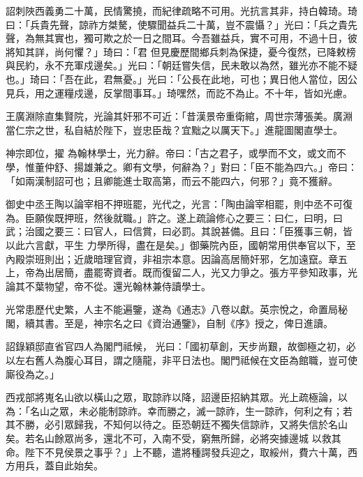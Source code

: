 \begin{pinyinscope}
 詔刺陜西義勇二十萬，民情驚撓，而紀律疏略不可用。光抗言其非，持白韓琦。琦曰：「兵貴先聲，諒祚方桀驁，使驟聞益兵二十萬，豈不震懾？」光曰：「兵之貴先聲，為無其實也，獨可欺之於一日之間耳。今吾雖益兵，實不可用，不過十日，彼將知其詳，尚何懼？」琦曰：「君
 但見慶歷間鄉兵刺為保捷，憂今復然，已降敕榜與民約，永不充軍戍邊矣。」光曰：「朝廷嘗失信，民未敢以為然，雖光亦不能不疑也。」琦曰：「吾在此，君無憂。」光曰：「公長在此地，可也；異日他人當位，因公見兵，用之運糧戍邊，反掌間事耳。」琦嘿然，而訖不為止。不十年，皆如光慮。



 王廣淵除直集賢院，光論其奸邪不可近：「昔漢景帝重衛綰，周世宗薄張美。廣淵當仁宗之世，私自結於陛下，豈忠臣哉？宜黜之以厲天下。」進龍圖閣直學士。



 神宗即位，擢
 為翰林學士，光力辭。帝曰：「古之君子，或學而不文，或文而不學，惟董仲舒、揚雄兼之。卿有文學，何辭為？」對曰：「臣不能為四六。」帝曰：「如兩漢制詔可也；且卿能進士取高第，而云不能四六，何邪？」竟不獲辭。



 御史中丞王陶以論宰相不押班罷，光代之，光言：「陶由論宰相罷，則中丞不可復為。臣願俟既押班，然後就職。」許之。遂上疏論修心之要三：曰仁，曰明，曰武；治國之要三：曰官人，曰信賞，曰必罰。其說甚備。且曰：「臣獲事三朝，皆以此六言獻，平生
 力學所得，盡在是矣。」御藥院內臣，國朝常用供奉官以下，至內殿崇班則出；近歲暗理官資，非祖宗本意。因論高居簡奸邪，乞加遠竄。章五上，帝為出居簡，盡罷寄資者。既而復留二人，光又力爭之。張方平參知政事，光論其不葉物望，帝不從。還光翰林兼侍讀學士。



 光常患歷代史繁，人主不能遍鑒，遂為《通志》八卷以獻。英宗悅之，命置局秘閣，續其書。至是，神宗名之曰《資治通鑒》，自制《序》授之，俾日進讀。



 詔錄穎邸直省官四人為閣門祗候，
 光曰：「國初草創，天步尚艱，故御極之初，必以左右舊人為腹心耳目，謂之隨龍，非平日法也。閣門祗候在文臣為館職，豈可使廝役為之。」



 西戎部將嵬名山欲以橫山之眾，取諒祚以降，詔邊臣招納其眾。光上疏極論，以為：「名山之眾，未必能制諒祚。幸而勝之，滅一諒祚，生一諒祚，何利之有；若其不勝，必引眾歸我，不知何以待之。臣恐朝廷不獨失信諒祚，又將失信於名山矣。若名山餘眾尚多，還北不可，入南不受，窮無所歸，必將突據邊城
 以救其命。陛下不見侯景之事乎？」上不聽，遣將種諤發兵迎之，取綏州，費六十萬，西方用兵，蓋自此始矣。




\end{pinyinscope}
